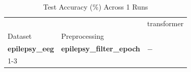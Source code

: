 \begin{table}
\caption{Test Accuracy (\%) Across 1 Runs}
\label{tab:results_acc}
\begin{tabular}{lll}
\toprule
 &  & transformer \\
Dataset & Preprocessing &  \\
\midrule
\textbf{epilepsy_eeg} & \textbf{epilepsy_filter_epoch} & $-$ \\
\cline{1-3}
\bottomrule
\end{tabular}
\end{table}
